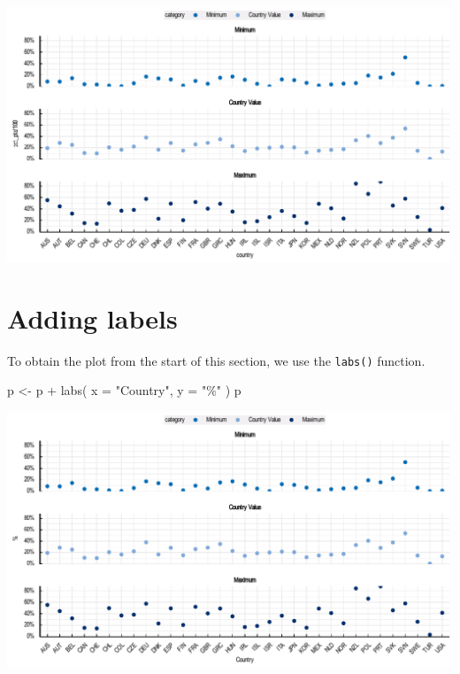 \documentclass[
  11pt,
  oneside]{report}
\newenvironment{Shaded}{\begin{snugshade}}{\end{snugshade}}
\newcommand{\AttributeTok}[1]{\textcolor[rgb]{0.77,0.63,0.00}{#1}}
\newcommand{\FunctionTok}[1]{\textcolor[rgb]{0.00,0.00,0.00}{#1}}
\newcommand{\NormalTok}[1]{#1}
\newcommand{\OtherTok}[1]{\textcolor[rgb]{0.56,0.35,0.01}{#1}}
\newcommand{\SpecialCharTok}[1]{\textcolor[rgb]{0.00,0.00,0.00}{#1}}
\newcommand{\StringTok}[1]{\textcolor[rgb]{0.31,0.60,0.02}{#1}}
\begin{document}
\begin{center}\includegraphics{book_figures/scatterplot_5-1} \end{center}

\hypertarget{adding-labels-1}{%
\section{Adding labels}\label{adding-labels-1}}

To obtain the plot from the start of this section, we use the
\texttt{labs()} function.

\begin{Shaded}
\begin{Highlighting}[]
\NormalTok{p }\OtherTok{\textless{}{-}}\NormalTok{ p }\SpecialCharTok{+}
  \FunctionTok{labs}\NormalTok{(}
    \AttributeTok{x =} \StringTok{"Country"}\NormalTok{,}
    \AttributeTok{y =} \StringTok{"\%"}
\NormalTok{  )}
\NormalTok{p}
\end{Highlighting}
\end{Shaded}

\begin{center}\includegraphics{book_figures/scatterplot_6-1} \end{center}
\end{document}
